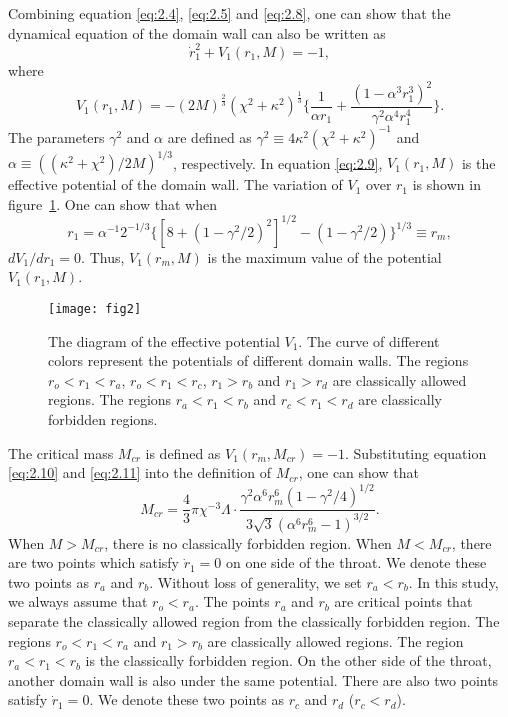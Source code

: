 \documentclass[12pt]{article}
\begin{document}
Combining equation \eqref{eq:2.4}, \eqref{eq:2.5} and \eqref{eq:2.8}, one can show that the dynamical equation of the domain wall can also be written as~\cite{EAJ}
\begin{equation}
\label{eq:2.9}%
\dot{r}_{1}^{2}+V_{1}(r_{1},M)=-1,
\end{equation}
where
\begin{equation}
\label{eq:2.10}%
V_{1}(r_{1}, M)=-(2M)^{\frac{2}{3}}(\chi^{2}+\kappa^{2})^{\frac{1}{3}}\big\{\frac{1}{\alpha r_{1}}+\frac{(1-\alpha^{3}r_{1}^{3})^{2}}{\gamma^{2}\alpha^{4}r_{1}^{4}}\big\}.
\end{equation}
The parameters $\gamma^{2}$ and $\alpha$ are defined as $\gamma^{2}\equiv 4\kappa^{2}(\chi^{2}+\kappa^{2})^{-1}$ and $\alpha\equiv((\kappa^{2}+\chi^{2})/2M)^{1/3}$, respectively.
In equation \eqref{eq:2.9}, $V_{1}(r_{1}, M)$ is the effective potential of the domain wall. The variation of $V_{1}$ over $r_{1}$ is shown in figure~\ref{fig:2}. One can show that when~\cite{SEA}
\begin{equation}
\label{eq:2.11}%
r_{1}=\alpha^{-1}2^{-1/3}\big\{[8+(1-\gamma^{2}/2)^{2}]^{1/2}-(1-\gamma^{2}/2)\big\}^{1/3}\equiv r_{m},
\end{equation}
$dV_{1}/dr_{1}=0$. Thus, $V_{1}(r_{m}, M)$ is the maximum value of the potential $V_{1}(r_{1},M)$.


\begin{figure}[tbp]
\centering
\texttt{[image: fig2]}
\caption{\label{fig:2} The diagram of the effective potential $V_{1}$. The curve of different colors represent the potentials of different domain walls. The regions $r_{o}<r_{1}<r_{a}$, $r_{o}<r_{1}<r_{c}$, $r_{1}>r_{b}$ and $r_{1}>r_{d}$ are classically allowed regions. The regions $r_{a}<r_{1}<r_{b}$ and $r_{c}<r_{1}<r_{d}$ are classically forbidden regions. }
\end{figure}

The critical mass $M_{cr}$ is defined as $V_{1}(r_{m}, M_{cr})=-1$. Substituting equation \eqref{eq:2.10} and \eqref{eq:2.11} into the definition of $M_{cr}$, one can show that~\cite{SEA}
\begin{equation}
\label{eq:2.12}%
M_{cr}=\frac{4}{3}\pi\chi^{-3}\Lambda\cdot\frac{\gamma^{2}\alpha^{6}r_{m}^{6}(1-\gamma^{2}/4)^{1/2}}{3\sqrt{3}(\alpha^{6}r_{m}^{6}-1)^{3/2}}.
\end{equation}
When  $M>M_{cr}$, there is no classically forbidden region. When $M<M_{cr}$, there are two points which satisfy $\dot{r}_{1}=0$ on one side of the throat. We denote these two points as $r_{a}$ and $r_{b}$. Without loss of generality, we set $r_{a}<r_{b}$. In this study, we always assume that $r_{o}<r_{a}$. The points $r_{a}$ and $r_{b}$ are critical points that separate the classically allowed region from the classically forbidden region. The regions $r_{o}<r_{1}<r_{a}$ and $r_{1}>r_{b}$ are classically allowed regions. The region $r_{a}<r_{1}<r_{b}$ is the classically forbidden region. On the other side of the throat, another domain wall is also under the same potential.  There are also two points satisfy $\dot{r}_{1}=0$. We denote these two points as $r_{c}$ and $r_{d}$ ($r_{c}<r_{d}$).
\end{document}
